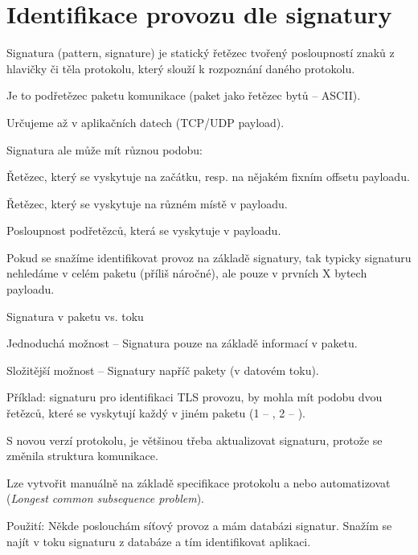 
\section{Identifikace provozu dle signatury}


\begin{compactitem}
    \item Signatura (pattern, signature) je statický řetězec tvořený posloupností znaků z hlavičky či těla protokolu, který slouží k rozpoznání daného protokolu. \begin{compactitem}
        \item Je to  podřetězec paketu komunikace (paket jako řetězec bytů -- ASCII).
        \item Určujeme až v aplikačních datech (TCP/UDP payload).
    \end{compactitem}
    \item Signatura ale může mít různou podobu: \begin{compactitem}
        \item Řetězec, který se vyskytuje na začátku, resp. na nějakém fixním offsetu payloadu.
        \item Řetězec, který se vyskytuje na různém místě v payloadu.
        \item Posloupnost podřetězců, která se vyskytuje v payloadu.
    \end{compactitem}
    \item Pokud se snažíme identifikovat provoz na základě signatury, tak typicky signaturu nehledáme v celém paketu (příliš náročné), ale pouze v prvních X bytech payloadu.
    \item Signatura v paketu vs. toku \begin{compactitem}
        \item Jednoduchá možnost -- Signatura pouze na základě informací v paketu.
        \item Složitější možnost -- Signatury napříč pakety (v datovém toku). \begin{compactitem}
            \item Příklad: signaturu pro identifikaci TLS provozu, by mohla mít podobu dvou řetězců, které se vyskytují každý v jiném paketu (1 -- , 2 -- ).
        \end{compactitem}
    \end{compactitem}
    \item S novou verzí protokolu, je většinou třeba aktualizovat signaturu, protože se změnila struktura komunikace.
    \item Lze vytvořit manuálně na základě specifikace protokolu a nebo automatizovat (\textit{Longest common subsequence problem}).
    \item Použití: Někde poslouchám síťový provoz a mám databázi signatur. Snažím se najít v toku signaturu z databáze a tím identifikovat aplikaci.
\end{compactitem}

